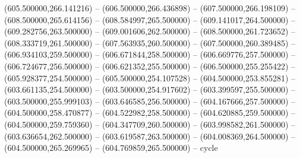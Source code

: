    (605.500000,266.141216) -- (606.500000,266.436898) -- (607.500000,266.198109) -- (608.500000,265.614156) -- (608.584997,265.500000) -- (609.141017,264.500000) -- (609.282756,263.500000) -- (609.001606,262.500000) -- (608.500000,261.723652) -- (608.333719,261.500000) -- (607.563935,260.500000) -- (607.500000,260.389485) -- (606.934103,259.500000) -- (606.671844,258.500000) -- (606.669776,257.500000) -- (606.724677,256.500000) -- (606.621352,255.500000) -- (606.500000,255.255422) -- (605.928377,254.500000) -- (605.500000,254.107528) -- (604.500000,253.855281) -- (603.661135,254.500000) -- (603.500000,254.917602) -- (603.399597,255.500000) -- (603.500000,255.999103) -- (603.646585,256.500000) -- (604.167666,257.500000) -- (604.500000,258.470877) -- (604.522982,258.500000) -- (604.620885,259.500000) -- (604.500000,259.759360) -- (604.347709,260.500000) -- (603.998582,261.500000) -- (603.636654,262.500000) -- (603.619587,263.500000) -- (604.008369,264.500000) -- (604.500000,265.269965) -- (604.769859,265.500000) -- cycle
